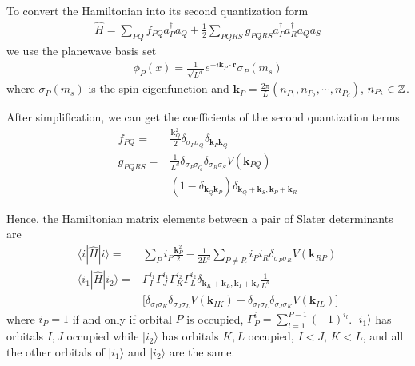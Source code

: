 \documentclass[%
reprint,
 superscriptaddress,
 amsmath,amssymb,
 aps,
]{revtex4-1}
\def\beq{\begin{eqnarray}}
\def\eeq{\end{eqnarray}}
\begin{document}
To convert the Hamiltonian into its second quantization form
\beq
\hat{H}=\sum_{PQ}f_{PQ}a_P^\dag a_Q+\frac{1}{2}\sum_{PQRS}g_{PQRS}a_P^\dag a_R^\dag a_Qa_S
\eeq
we use the planewave basis set
\beq
\phi_P(x)=\frac{1}{\sqrt{L^d}}e^{-i\mathbf{k}_P\cdot\mathbf{r}}\sigma_P(m_s)
\eeq
where $\sigma_P(m_s)$ is the spin eigenfunction and $\mathbf{k}_P=\frac{2\pi}{L}(n_{P_1}, n_{P_2},\cdots, n_{P_d})$, $n_{P_i}\in\Bbb{Z}$.

After simplification, we can get the coefficients of the second quantization terms
\begin{align*}
f_{PQ}= & \frac{\mathbf{k}_Q^2}{2}\delta_{\sigma_P\sigma_Q}\delta_{\mathbf{k}_P\mathbf{k}_Q}\\
g_{PQRS}= & \frac{1}{L^d}\delta_{\sigma_P\sigma_Q}\delta_{\sigma_R\sigma_S}V(\mathbf{k}_{PQ})\\
& (1-\delta_{\mathbf{k}_Q\mathbf{k}_P})\delta_{\mathbf{k}_Q+\mathbf{k}_S,\mathbf{k}_P+\mathbf{k}_R}
\end{align*}

Hence, the Hamiltonian matrix elements between a pair of Slater determinants are
\begin{align*}
\langle i|\hat{H}|i\rangle  = & \sum_{P}i_P\frac{\mathbf{k}_P^2}{2}-\frac{1}{2L^d}\sum_{P\ne R}i_Pi_R\delta_{\sigma_P\sigma_R}V(\mathbf{k}_{RP})\\
\langle i_1|\hat{H}|i_2\rangle  = &  \Gamma_I^{i_1}\Gamma_J^{i_1}\Gamma_K^{i_2}\Gamma_L^{i_2}\delta_{\mathbf{k}_K+\mathbf{k}_L,\mathbf{k}_I+\mathbf{k}_J}\frac{1}{L^d}\\
&  \lbrack\delta_{\sigma_I\sigma_K}\delta_{\sigma_J\sigma_L}V(\mathbf{k}_{IK})-\delta_{\sigma_I\sigma_L}\delta_{\sigma_J\sigma_K}V(\mathbf{k}_{IL})\rbrack
\end{align*}
where $i_P=1$ if and only if orbital $P$ is occupied, $\Gamma_P^i=\sum_{l=1}^{P-1}(-1)^{i_l}$. $|i_1\rangle$ has orbitals $I,J$ occupied while $|i_2\rangle$ has orbitals $K,L$ occupied, $I<J$, $K<L$, and all the other orbitals of $|i_1\rangle$ and $|i_2\rangle$ are the same.

%
%

\end{document}
